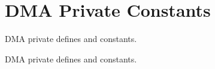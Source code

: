 \hypertarget{group___d_m_a___private___constants}{}\section{D\+MA Private Constants}
\label{group___d_m_a___private___constants}


D\+MA private defines and constants.  


D\+MA private defines and constants. 

